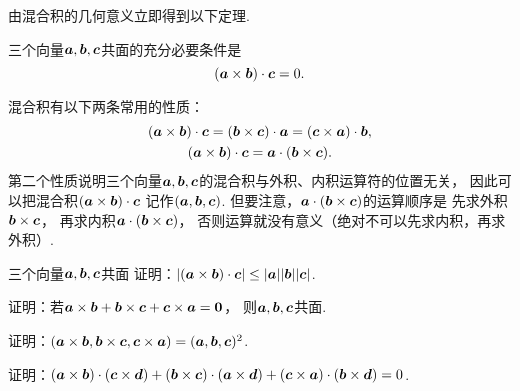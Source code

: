 由混合积的几何意义立即得到以下定理.
\begin{theorem}
三个向量\(\boldsymbol{a},\boldsymbol{b},\boldsymbol{c}\)共面的充分必要条件是\begin{equation*}
	(\boldsymbol{a}\times\boldsymbol{b})\cdot\boldsymbol{c} = 0.
\end{equation*}
\end{theorem}

混合积有以下两条常用的性质：
\begin{gather}
	(\boldsymbol{a}\times\boldsymbol{b})\cdot\boldsymbol{c}
	= (\boldsymbol{b}\times\boldsymbol{c})\cdot\boldsymbol{a}
	= (\boldsymbol{c}\times\boldsymbol{a})\cdot\boldsymbol{b}, \\
	(\boldsymbol{a}\times\boldsymbol{b})\cdot\boldsymbol{c}
	= \boldsymbol{a}\cdot(\boldsymbol{b}\times\boldsymbol{c}).
\end{gather}
第二个性质说明三个向量\(\boldsymbol{a},\boldsymbol{b},\boldsymbol{c}\)的混合积与外积、内积运算符的位置无关，
因此可以把混合积\((\boldsymbol{a}\times\boldsymbol{b})\cdot\boldsymbol{c}\)
记作\((\boldsymbol{a},\boldsymbol{b},\boldsymbol{c})\).
但要注意，\(\boldsymbol{a}\cdot(\boldsymbol{b}\times\boldsymbol{c})\)的运算顺序是
先求外积\(\boldsymbol{b}\times\boldsymbol{c}\)，
再求内积\(\boldsymbol{a}\cdot(\boldsymbol{b}\times\boldsymbol{c})\)，
否则运算就没有意义（绝对不可以先求内积，再求外积）.

\begin{example}
三个向量\(\boldsymbol{a},\boldsymbol{b},\boldsymbol{c}\)共面
证明：\(\abs{(\boldsymbol{a}\times\boldsymbol{b})\cdot\boldsymbol{c}}
\leq \abs{\boldsymbol{a}} \abs{\boldsymbol{b}} \abs{\boldsymbol{c}}\).
\end{example}

\begin{example}
证明：若\(\boldsymbol{a}\times\boldsymbol{b}
+ \boldsymbol{b}\times\boldsymbol{c}
+ \boldsymbol{c}\times\boldsymbol{a}
= \boldsymbol{0}\)，
则\(\boldsymbol{a},\boldsymbol{b},\boldsymbol{c}\)共面.
\end{example}

\begin{example}
证明：\((\boldsymbol{a}\times\boldsymbol{b},\boldsymbol{b}\times\boldsymbol{c},\boldsymbol{c}\times\boldsymbol{a})
= (\boldsymbol{a},\boldsymbol{b},\boldsymbol{c})^2\).
\end{example}

\begin{example}
证明：\((\boldsymbol{a}\times\boldsymbol{b})\cdot(\boldsymbol{c}\times\boldsymbol{d})
+ (\boldsymbol{b}\times\boldsymbol{c})\cdot(\boldsymbol{a}\times\boldsymbol{d})
+ (\boldsymbol{c}\times\boldsymbol{a})\cdot(\boldsymbol{b}\times\boldsymbol{d})
= 0\).
\end{example}

